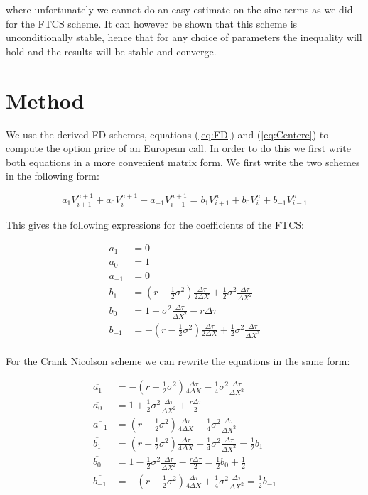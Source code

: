 \documentclass[11pt,a4paper]{article}
\begin{document}
where unfortunately we cannot do an easy estimate on the sine terms as we did for the FTCS scheme. It can however be shown that this scheme is unconditionally stable, hence that for any choice of parameters the inequality will hold and the results will be stable and converge.

\newpage
\section{Method}

We use the derived FD-schemes, equations (\ref{eq:FD}) and (\ref{eq:Centere}) to compute the option price of an European call. In order to do this we first write both equations in a more convenient matrix form. We first write the two schemes in the following form:

\begin{equation}
  a_1V^{n+1}_{i+1} + a_0V^{n+1}_i + a_{-1}V^{n+1}_{i-1} = b_1V^{n}_{i+1} + b_0V^{n}_i + b_{-1}V^{n}_{i-1}
\label{eq:specialequation}
\end{equation}

This gives the following expressions for the coefficients of the FTCS:

\begin{align*}
a_1&=0\\
a_0&=1\\
a_{-1}&=0\\
b_1&=\left(r-\frac{1}{2}\sigma^2\right)\frac{\Delta \tau}{2\Delta X}+\frac{1}{2}\sigma^2\frac{\Delta \tau}{\Delta X^2}\\
b_0&=1-\sigma^2\frac{\Delta \tau}{\Delta X^2}-r\Delta \tau\\
b_{-1}&=-\left(r-\frac{1}{2}\sigma^2\right)\frac{\Delta \tau}{2\Delta X}+\frac{1}{2}\sigma^2\frac{\Delta \tau}{\Delta X^2}\\
\end{align*}

For the Crank Nicolson scheme we can rewrite the equations in the same form:

\begin{align*}
\overline{a_1}&=-\left(r-\frac{1}{2}\sigma^2\right)\frac{\Delta \tau}{4\Delta X}-\frac{1}{4}\sigma^2\frac{\Delta \tau}{\Delta X^2}\\
\overline{a_0}&=1+\frac{1}{2}\sigma^2\frac{\Delta \tau}{\Delta X^2}+\frac{r\Delta \tau}{2}\\
\overline{a_{-1}}&=\left(r-\frac{1}{2}\sigma^2\right)\frac{\Delta \tau}{4\Delta X}-\frac{1}{4}\sigma^2\frac{\Delta \tau}{\Delta X^2}\\
\overline{b_1}&=\left(r-\frac{1}{2}\sigma^2\right)\frac{\Delta \tau}{4\Delta X}+\frac{1}{4}\sigma^2\frac{\Delta \tau}{\Delta X^2}=\frac{1}{2}b_1\\
\overline{b_0}&=1-\frac{1}{2}\sigma^2\frac{\Delta \tau}{\Delta X^2}-\frac{r\Delta \tau}{2}=\frac{1}{2}b_0+\frac{1}{2}\\
\overline{b_{-1}}&=-\left(r-\frac{1}{2}\sigma^2\right)\frac{\Delta \tau}{4\Delta X}+\frac{1}{4}\sigma^2\frac{\Delta \tau}{\Delta X^2}=\frac{1}{2}b_{-1}\\
\end{align*}
\end{document}
